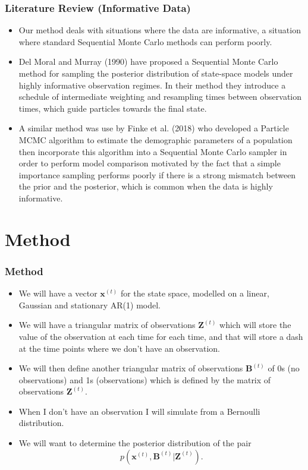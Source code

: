\documentclass[9pt]{beamer}
\begin{document}
\begin{frame}
\frametitle{Literature Review (Informative Data)}
\begin{itemize}
\setlength\itemsep{2em}
\item Our method deals with situations where the data are informative, a situation where standard Sequential Monte Carlo methods can perform poorly.
\item Del Moral and Murray (1990) have proposed a Sequential Monte Carlo method for sampling the posterior distribution of state-space models under highly informative observation regimes. In their method they introduce a schedule of intermediate weighting and resampling times between observation times, which guide particles towards the final state.
\item A similar method was use by Finke et al. (2018) who developed a Particle MCMC algorithm to estimate the demographic parameters of a population then incorporate this algorithm into a Sequential Monte Carlo sampler in order to perform model comparison motivated by the fact that a simple importance sampling performs poorly if there is a strong mismatch between the prior and the posterior, which is common when the data is highly informative.
\end{itemize}
\end{frame}

\section{Method}

\begin{frame}
\frametitle{Method}
\begin{itemize}
\setlength\itemsep{1em}
\item We will have a vector $\bm x^{(t)}$ for the state space, modelled on a linear, Gaussian and stationary AR(1) model. 
\item We will have a triangular matrix of observations $\bm{Z}^{(t)}$ which will store the value of the observation at each time for each time, and that will store a dash at the time points where we don't have an observation. 
\item We will then define another triangular matrix of observations  $\bm{B}^{(t)}$ of 0s (no observations) and 1s (observations) which is defined by the matrix of observations $\bm{Z}^{(t)}$. \item When I don't have an observation I will simulate from a Bernoulli distribution.
\item We will want to determine the posterior distribution of the pair 
    \[
    p(\bm{x}^{(t)}, \bm{B}^{(t)} | \bm{Z}^{(t)}).
    \]
\end{itemize}
\end{frame}
\end{document}
